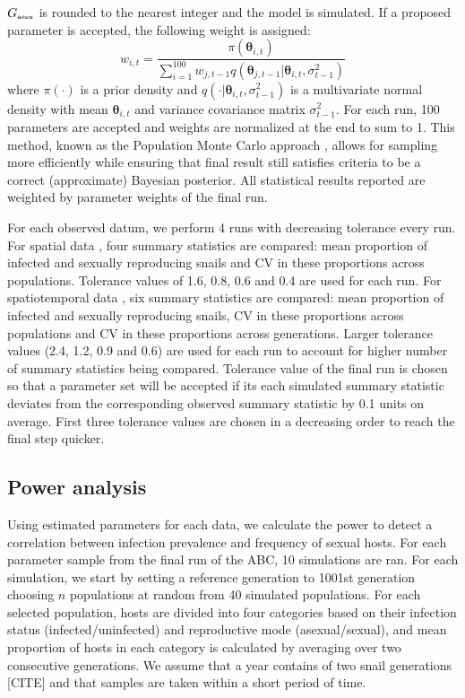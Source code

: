 \documentclass{article}\usepackage[]{graphicx}\usepackage[]{color}
\begin{document}
$G_{\textrm{\tiny asex}}$ is rounded to the nearest integer and the model is simulated.
If a proposed parameter is accepted, the following weight is assigned:
$$
w_{i,t} = \frac{\pi(\bm\theta_{i, t})}{\sum_{i=1}^{100} w_{j, t-1} q(\bm\theta_{j, t-1} | \bm\theta_{i,t}, \sigma_{t-1}^2)}
$$
where $\pi(\cdot)$ is a prior density and $q(\cdot | \bm\theta_{i,t}, \sigma_{t-1}^2)$ is a multivariate normal density with mean $\bm\theta_{i,t}$ and variance covariance matrix $\sigma_{t-1}^2$.
For each run, 100 parameters are accepted and weights are normalized at the end to sum to 1.
This method, known as the Population Monte Carlo approach \citep{turner2012tutorial}, allows for sampling more efficiently while ensuring that final result still satisfies criteria to be a correct (approximate) Bayesian posterior.
All statistical results reported are weighted by parameter weights of the final run.

For each observed datum, we perform 4 runs with decreasing tolerance every run.
For spatial data \citep{dagan2013clonal, mckone2016fine}, four summary statistics are compared: mean proportion of infected and sexually reproducing snails and CV in these proportions across populations.
Tolerance values of 1.6, 0.8, 0.6 and 0.4 are used for each run.
For spatiotemporal data \citep{vergara2014infection}, six summary statistics are compared: mean proportion of infected and sexually reproducing snails, CV in these proportions across populations and CV in these proportions across generations.
Larger tolerance values (2.4, 1.2, 0.9 and 0.6) are used for each run to account for higher number of summary statistics being compared.
Tolerance value of the final run is chosen so that a parameter set will be accepted if its each simulated summary statistic deviates from the corresponding observed summary statistic by 0.1 units on average.
First three tolerance values are chosen in a decreasing order to reach the final step quicker.

\subsection{Power analysis}

Using estimated parameters for each data, we calculate the power to detect a correlation between infection prevalence and frequency of sexual hosts.
For each parameter sample from the final run of the ABC, 10 simulations are ran.
For each simulation, we start by setting a reference generation to 1001st generation choosing $n$ populations at random from 40 simulated populations.
For each selected population, hosts are divided into four categories based on their infection status (infected/uninfected) and reproductive mode (asexual/sexual),
and mean proportion of hosts in each category is calculated by averaging over two consecutive generations.
We assume that a year contains of two snail generations [CITE] and that samples are taken within a short period of time.
\end{document}
